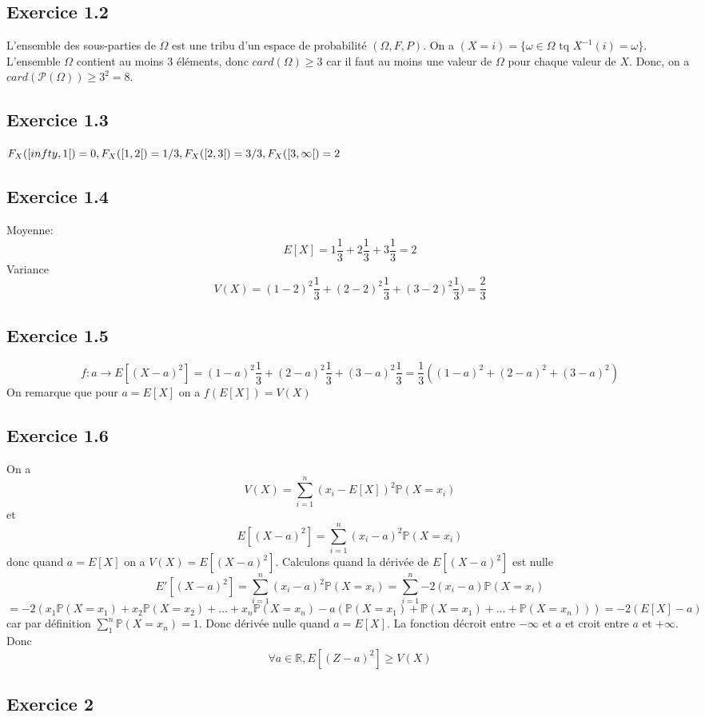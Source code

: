 \documentclass[]{book}
\theoremstyle{definition}
\newcommand{\bb}[1]{\mathbb{#1}}
\newcommand{\R}{\bb{R}}
\newcommand{\Pe}{\bb{P}}
\begin{document}
\subsection*{Exercice 1.2}
L'ensemble des sous-parties de $\Omega$ est une tribu d'un espace de probabilit\'e $(\Omega, F,P)$. On a $(X=i) = \{\omega \in \Omega \text{ tq } X^{-1}(i) = \omega\}$. L'ensemble $\Omega$ contient au moins 3 \'el\'ements, donc $card(\Omega) \geq 3$ car il faut au moins une valeur de $\Omega$ pour chaque valeur de $X$. Donc, on a $card(\mathcal{P}(\Omega)) \geq 3^2 = 8$.


\subsection*{Exercice 1.3}
$F_X([\-infty, 1[) = 0, F_X([1, 2[) = 1/3, F_X([2, 3[) = 3/3, F_X([3, \infty[) = 2$

\subsection*{Exercice 1.4}
Moyenne:
$$
E[X] = 1\frac{1}{3}+2\frac{1}{3}+3\frac{1}{3} = 2
$$
Variance
$$
V(X) = (1-2)^2\frac{1}{3}+(2-2)^2\frac{1}{3}+(3-2)^2\frac{1}{3}) = \frac{2}{3}
$$

\subsection*{Exercice 1.5}
$$
f: a \to E[(X-a)^2] = (1-a)^2\frac{1}{3} + (2-a)^2\frac{1}{3} + (3-a)^2\frac{1}{3} = \frac{1}{3}((1-a)^2+(2-a)^2+(3-a)^2)
$$
On remarque que pour $a=E[X]$ on a $f(E[X]) = V(X)$

\subsection*{Exercice 1.6}
On a
$$
V(X)= \sum_{i=1}^{n}{(x_i-E[X])^2\Pe(X=x_i)}
$$
et
$$
E[(X-a)^2] = \sum_{i=1}^{n}{(x_i-a)^2\Pe(X=x_i)}
$$
donc quand $a=E[X]$ on a $V(X)=E[(X-a)^2]$.
Calculons quand la d\'eriv\'ee de $E[(X-a)^2]$ est nulle
$$
E'[(X-a)^2] = \sum_{i=1}^{n}{(x_i-a)^2\Pe(X=x_i)} = \sum_{i=1}^{n}{-2(x_i-a)\Pe(X=x_i)} 
$$
$$
= -2(x_1\Pe(X=x_1)+x_2\Pe(X=x_2)+\ldots + x_n\Pe(X=x_n) - a(\Pe(X=x_1)+ \Pe(X=x_1) + \ldots + \Pe(X=x_n))) = -2(E[X] - a)
$$
car par d\'efinition $\sum_{1}^{n}{\Pe(X=x_n)} = 1$. Donc d\'eriv\'ee nulle quand $a=E[X]$.
La fonction d\'ecroit entre $-\infty$ et $a$ et croit entre $a$ et $+\infty$. Donc 
$$
\forall a \in \R, E[(Z-a)^2] \geq V(X)
$$

\subsection*{Exercice 2}
\end{document}
